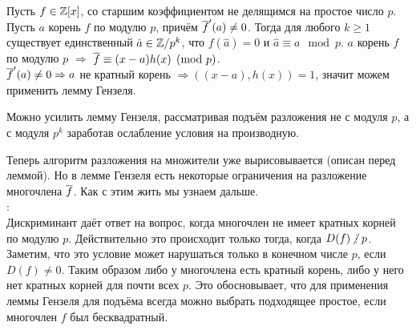 \crl Пусть $f \in \mathbb{Z}[x]$, со старшим коэффициентом не делящимся на простое число $p$. Пусть $a$ корень $f$ по модулю $p$, причём $\overline{f}'(a)\neq 0$. Тогда  для любого $k\geq 1$ существует единственный $ \hat{a}\in \mathbb{Z}/p^k$,  что $f(\hat{a})=0$ и $\hat{a} \equiv a \mod p$.
\proof
    $a$ корень $f$ по модулю $p$ $\Rightarrow$ $\overline{f} \equiv (x - a)h(x) \pmod{p}$.\\
    $\overline{f}'(a)\neq 0 \Rightarrow a$ не кратный корень $\Rightarrow ((x - a), h(x)) = 1$, значит можем применить лемму Гензеля.
\endproof
\ecrl

\rm Можно усилить лемму Гензеля, рассматривая подъём разложения не с модуля $p$, а с модуля $p^k$ заработав ослабление условия на производную.
\erm


Теперь алгоритм разложения на множители уже вырисовывается (описан перед леммой).
Но в лемме Гензеля есть некоторые ограничения на разложение многочлена $\overline{f}$. Как с этим жить мы узнаем дальше.\\

{}:\\
Дискриминант даёт ответ на вопрос, когда многочлен не имеет кратных корней по модулю $p$. Действительно это происходит только тогда, когда $D(f)\ndi p$. Заметим, что это условие может нарушаться только в конечном числе $p$, если $D(f)\neq 0$. Таким образом либо у многочлена есть кратный корень, либо у него нет кратных корней для почти всех $p$. Это обосновывает, что для применения леммы Гензеля для подъёма всегда можно выбрать подходящее простое, если многочлен $f$ был бесквадратный.

